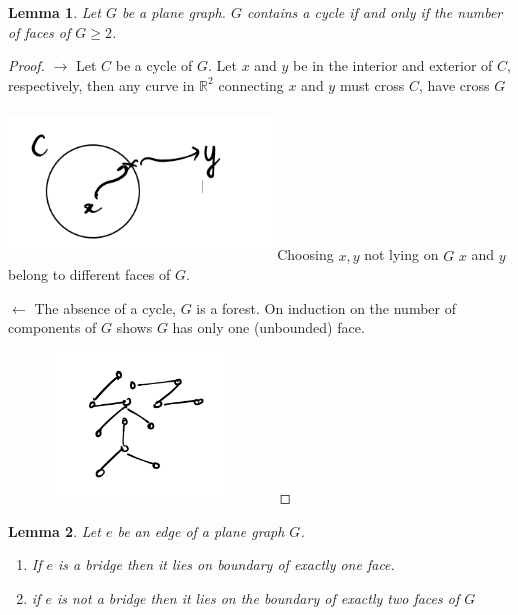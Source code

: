 \documentclass[12pt]{article}
\newtheorem*{lemma}{Lemma}
\newenvironment{pro}{\begin{proof}}{\end{proof}}
\begin{document}
\begin{lemma}
	Let $G$ be a plane graph. $G$ contains a cycle if and only if the number of faces of $G \ge 2$.
\end{lemma}

\begin{pro}
	$\rightarrow$ Let $C$ be a cycle of $G$. Let $x$ and $y$ be in the interior and exterior of $C$, respectively, then any curve in $\mathbb{R}^{2}$ connecting $x$ and $y$ must cross $C$, have cross $G$


	\includegraphics[width=7cm,height=4cm]{circle_proof}
	Choosing $x, y$ not lying on $G$ $x$ and $y$ belong to different faces of $G$.

	$\leftarrow$ The absence of a cycle, $G$ is a forest. On induction on the number of components of $G$ shows $G$ has only one (unbounded) face.


	\includegraphics[width=7cm,height=4cm]{circle_proof2}
\end{pro}



\begin{lemma}
	Let $e$ be an edge of a plane graph $G$.
	\begin{enumerate}
		\item If $e$ is a bridge then it lies on boundary of exactly one face.
		\item if $e$ is not a bridge then it lies on the boundary of exactly two faces of $G$
	\end{enumerate}
\end{lemma}
\end{document}
